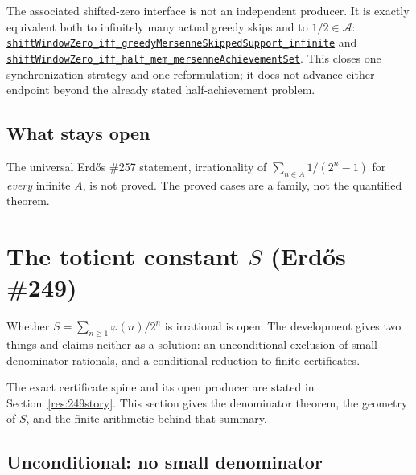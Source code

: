 \documentclass[11pt]{article}
\newcommand{\commit}{81150c1c6fdd4cd51e76d3aa0de344341e0e9e7c}
\newcommand{\repobase}{https://github.com/wcook04/plectis-lean-erdos249-257/blob/\commit}
\newcommand{\PK}{Erdos249257}
\newcommand{\lref}[3]{\href{\repobase/\PK/#1\#L#2}{\nolinkurl{#3}}}
\newcommand{\lrefx}[3]{\href{\repobase/\PK/#1\#L#2}{\nolinkurl{#3}}}
\theoremstyle{definition}
\theoremstyle{remark}
\newcommand{\ph}{\varphi}
\begin{document}
The associated shifted-zero interface is not an independent producer.  It is
exactly equivalent both to infinitely many actual greedy skips and to
$1/2\in\mathcal A$:
\lrefx{CampbellShiftSynchronization.lean}{471}{shiftWindowZero_iff_greedyMersenneSkippedSupport_infinite}
and
\lref{CampbellShiftSynchronization.lean}{488}{shiftWindowZero_iff_half_mem_mersenneAchievementSet}.
This closes one synchronization strategy and one reformulation; it does not
advance either endpoint beyond the already stated half-achievement problem.

\subsection{What stays open}

The universal Erd\H{o}s \#257 statement, irrationality of $\sum_{n\in A}1/(2^n-1)$
for \emph{every} infinite $A$, is not proved. The proved cases are a family, not
the quantified theorem.

\section{The totient constant $S$ (Erd\H{o}s \#249)}\label{sec:249}

Whether $S=\sum_{n\ge1}\ph(n)/2^n$ is irrational is open. The development gives two
things and claims neither as a solution: an unconditional exclusion of
small-denominator rationals, and a conditional reduction to finite certificates.

The exact certificate spine and its open producer are stated in
Section~\ref{res:249story}.  This section gives the denominator theorem, the
geometry of $S$, and the finite arithmetic behind that summary.

\subsection{Unconditional: no small denominator}\label{sec:uncond}
\end{document}
